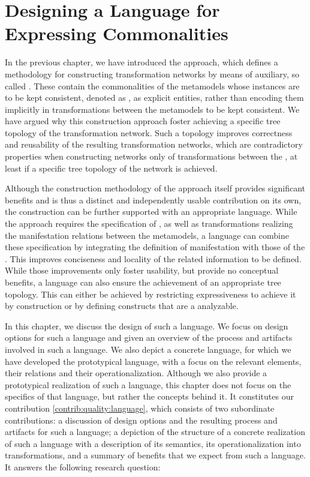 \chapter{Designing a Language for Expressing Commonalities 
}
\label{chap:language}

In the previous chapter, we have introduced the \commonalities approach, which defines a methodology for constructing transformation networks by means of auxiliary, so called \conceptmetamodels.
These \conceptmetamodels contain the commonalities of the metamodels whose instances are to be kept consistent, denoted as \concretemetamodels, as explicit entities, rather than encoding them implicitly in transformations between the metamodels to be kept consistent.
We have argued why this construction approach foster achieving a specific tree topology of the transformation network.
Such a topology improves correctness and reusability of the resulting transformation networks, which are contradictory properties when constructing networks only of transformations between the \concretemetamodels, at least if a specific tree topology of the network is achieved.

Although the construction methodology of the \commonalities approach itself provides significant benefits and is thus a distinct and independently usable contribution on its own, the construction can be further supported with an appropriate language.
While the approach requires the specification of \conceptmetamodels, as well as transformations realizing the manifestation relations between the metamodels, a language can combine these specification by integrating the definition of manifestation with those of the \commonalities.
This improves conciseness and locality of the related information to be defined.
While those improvements only foster usability, but provide no conceptual benefits, a language can also ensure the achievement of an appropriate tree topology.
This can either be achieved by restricting expressiveness to achieve it by construction or by defining constructs that are a analyzable.

In this chapter, we discuss the design of such a language.
We focus on design options for such a language and given an overview of the process and artifacts involved in such a language.
We also depict a concrete language, for which we have developed the prototypical \commonalities language, with a focus on the relevant elements, their relations and their operationalization.
Although we also provide a prototypical realization of such a language, this chapter does not focus on the specifics of that language, but rather the concepts behind it.
It constitutes our contribution \autoref{contrib:quality:language}, which consists of two subordinate contributions: a discussion of design options and the resulting process and artifacts for such a language; a depiction of the structure of a concrete realization of such a language with a description of its semantics, its operationalization into transformations, and a summary of benefits that we expect from such a language.
It answers the following research question:

